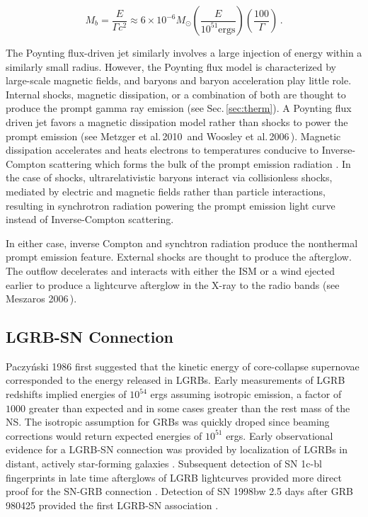 \documentclass{article}
\begin{document}
\begin{equation}
M_{b} = \frac{E}{\Gamma c^2} \approx 6 \times 10^{-6} M_{\odot} \left(\frac{E}{10^{51} \mathrm{ergs}}\right) \left(\frac{100}{\Gamma}\right)\,.
\end{equation}

The Poynting flux-driven jet similarly involves a large injection of energy within a similarly small radius. However, the Poynting flux model is characterized by large-scale magnetic fields, and baryons and baryon acceleration play little role. Internal shocks, magnetic dissipation, or a combination of both are thought to produce the prompt gamma ray emission (see Sec.\,\ref{sec:therm}). A Poynting flux driven jet favors a magnetic dissipation model rather than shocks to power the prompt emission (see Metzger et al.\,2010\,\cite{Metzger:2010pp} and Woosley et al.\,2006\,\cite{Woosley:2006fn}). Magnetic dissipation accelerates and heats electrons to temperatures conducive to Inverse-Compton scattering which forms the bulk of the prompt emission radiation \cite{Metzger:2010pp}. In the case of shocks, ultrarelativistic baryons interact via collisionless shocks, mediated by electric and magnetic fields rather than particle interactions, resulting in synchrotron radiation powering the prompt emission light curve instead of Inverse-Compton scattering\cite{Metzger:2010pp}. 

In either case, inverse Compton and synchtron radiation produce the nonthermal prompt emission feature. External shocks are thought to produce the afterglow. The outflow decelerates and interacts with either the ISM or a wind ejected earlier to produce a lightcurve afterglow in the X-ray to the radio bands (see Meszaros 2006\,\cite{Meszaros:2006rc}).
 
\subsection{LGRB-SN Connection}

Paczy\'nski 1986 \cite{Pac:1986ap} first suggested that the kinetic energy of core-collapse supernovae corresponded to the energy released in LGRBs. Early measurements of LGRB redshifts implied energies of $10^{54}$ ergs assuming isotropic emission, a factor of $1000$ greater than expected and in some cases greater than the rest mass of the NS. The isotropic assumption for GRBs was quickly droped since beaming corrections would return expected energies of $10^{51}$ ergs. Early observational evidence for a LGRB-SN connection was provided by localization of LGRBs in distant, actively star-forming galaxies \cite{Woosley:2006fn}\cite{Djorgo:2001}. Subsequent detection of SN 1c-bl fingerprints in late time afterglows of LGRB lightcurves provided more direct proof for the SN-GRB connection \cite{Modjaz:2011}. Detection of SN 1998bw 2.5 days after GRB 980425 provided the first LGRB-SN association \cite{Pian:1999ec}.
\end{document}
